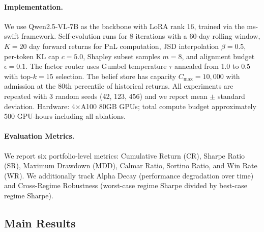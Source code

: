\paragraph{Implementation.} We use Qwen2.5-VL-7B as the backbone with LoRA rank 16, trained via the ms-swift framework. Self-evolution runs for 8 iterations with a 60-day rolling window, $K{=}20$ day forward returns for PnL computation, JSD interpolation $\beta{=}0.5$, per-token KL cap $c{=}5.0$, Shapley subset samples $m{=}8$, and alignment budget $\epsilon{=}0.1$. The factor router uses Gumbel temperature $\tau$ annealed from 1.0 to 0.5 with top-$k{=}15$ selection. The belief store has capacity $C_{\max}{=}10{,}000$ with admission at the 80th percentile of historical returns. All experiments are repeated with 3 random seeds (42, 123, 456) and we report mean $\pm$ standard deviation. Hardware: 4$\times$A100 80GB GPUs; total compute budget approximately 500 GPU-hours including all ablations.

\paragraph{Evaluation Metrics.} We report six portfolio-level metrics: Cumulative Return (CR), Sharpe Ratio (SR), Maximum Drawdown (MDD), Calmar Ratio, Sortino Ratio, and Win Rate (WR). We additionally track Alpha Decay (performance degradation over time) and Cross-Regime Robustness (worst-case regime Sharpe divided by best-case regime Sharpe).

\subsection{Main Results}



